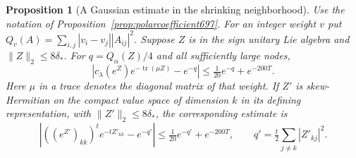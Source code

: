 \documentclass[a4paper,11pt]{article}
\newtheorem{proposition}{Proposition}[section]
\theoremstyle{definition}
\theoremstyle{remark}
\numberwithin{equation}{section}
\begin{document}
\begin{proposition}[A Gaussian estimate in the shrinking neighborhood]\leavevmode
\label{prop:localgaussian698}
Use the notation of Proposition~\ref{prop:polarcoefficient697}.
For an integer weight \(v\) put
\(Q_v(A)=\sum_{i,j}|v_i-v_j||A_{ij}|^2\). Suppose \(Z\)
is in the sign unitary Lie algebra and \(\|Z\|_2\le8\delta_*\).
For \(q=Q_\alpha(Z)/4\) and all sufficiently large nodes,
\[
 \left| c_\lambda(e^Z)e^{-\operatorname{tr}(\mu Z)}
                    -e^{-q}\right|
            \le \tfrac1{20}e^{-q}+e^{-200T}.
\]
Here \(\mu\) in a trace denotes the diagonal matrix of that
weight. If \(Z'\) is skew-Hermitian on the compact value
space of dimension \(k\) in its defining representation,
with \(\|Z'\|_2\le8\delta_*\), the corresponding estimate is
\[
 \left| ((e^{Z'})_{kk})^t e^{-tZ'_{kk}}-e^{-q'}\right|
          \le\tfrac1{20}e^{-q'}+e^{-200T},\qquad
 q'=\tfrac t2\sum_{j\ne k}|Z'_{kj}|^2 .
\]
\end{proposition}
\end{document}

